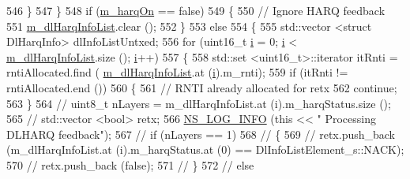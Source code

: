 \begin{DoxyCode}
{546                 \}
547         \}
548         \textcolor{keywordflow}{if} (\hyperlink{classns3_1_1MmWaveRrMacScheduler_ad8bb79b5853000b363b42a158633a942}{m\_harqOn} == \textcolor{keyword}{false})
549         \{
550                 \textcolor{comment}{// Ignore HARQ feedback}
551                 \hyperlink{classns3_1_1MmWaveRrMacScheduler_a1b1043d7f9994e2ee6a7e1b368e9d7a1}{m\_dlHarqInfoList}.clear ();
552         \}
553         \textcolor{keywordflow}{else}
554         \{
555                 std::vector <struct DlHarqInfo> dlInfoListUntxed;
556                 \textcolor{keywordflow}{for} (uint16\_t \hyperlink{bernuolliDistribution_8m_a6f6ccfcf58b31cb6412107d9d5281426}{i} = 0; \hyperlink{bernuolliDistribution_8m_a6f6ccfcf58b31cb6412107d9d5281426}{i} < \hyperlink{classns3_1_1MmWaveRrMacScheduler_a1b1043d7f9994e2ee6a7e1b368e9d7a1}{m\_dlHarqInfoList}.size (); 
      \hyperlink{bernuolliDistribution_8m_a6f6ccfcf58b31cb6412107d9d5281426}{i}++)
557                 \{
558                         std::set <uint16\_t>::iterator itRnti = rntiAllocated.find (
      \hyperlink{classns3_1_1MmWaveRrMacScheduler_a1b1043d7f9994e2ee6a7e1b368e9d7a1}{m\_dlHarqInfoList}.at (\hyperlink{bernuolliDistribution_8m_a6f6ccfcf58b31cb6412107d9d5281426}{i}).m\_rnti);
559                         \textcolor{keywordflow}{if} (itRnti != rntiAllocated.end ())
560                         \{
561                                 \textcolor{comment}{// RNTI already allocated for retx}
562                                 \textcolor{keywordflow}{continue};
563                         \}
564                         \textcolor{comment}{//              uint8\_t nLayers = m\_dlHarqInfoList.at (i).m\_harqStatus.size ();}
565                         \textcolor{comment}{//                              std::vector <bool> retx;}
566                         \hyperlink{group__logging_gafbd73ee2cf9f26b319f49086d8e860fb}{NS\_LOG\_INFO} (\textcolor{keyword}{this} << \textcolor{stringliteral}{" Processing DLHARQ feedback"});
567                         \textcolor{comment}{//                              if (nLayers == 1)}
568                         \textcolor{comment}{//                                \{}
569                         \textcolor{comment}{//                                  retx.push\_back (m\_dlHarqInfoList.at
       (i).m\_harqStatus.at (0) == DlInfoListElement\_s::NACK);}
570                         \textcolor{comment}{//                                  retx.push\_back (false);}
571                         \textcolor{comment}{//                                \}}
572                         \textcolor{comment}{//                              else}
}
\end{DoxyCode}
